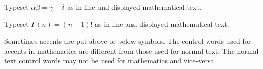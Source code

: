 

\exercise Typeset $\alpha\beta=\gamma+\delta$ as in-line and displayed 
mathematical text. 

\exercise Typeset $\Gamma(n) = (n-1)!$ as in-line and displayed 
mathematical text. 

Sometimes accents are put above or below symbols.  The control 
words used for accents in mathematics are different from those 
used for normal text.   The normal text control words may not be 
used for mathematics and vice-versa. 





